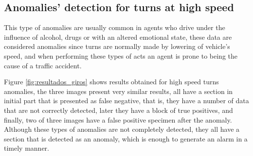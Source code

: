\subsection{Anomalies' detection for turns at high speed}

This type of anomalies are usually common in agents who drive under the influence of alcohol, drugs or with an altered emotional state, these data are considered anomalies since turns are normally made by lowering of vehicle's speed, and when performing these types of acts an agent is prone to being the cause of a traffic accident.

\vspace{5mm} %

Figure \ref{fig:resultados_giros} shows results obtained for high speed turns anomalies, the three images present very similar results, all have a section in initial part that is presented as false negative, that is, they have a number of data that are not correctly detected, later they have a block of true positives, and finally, two of three images have a false positive specimen after the anomaly. Although these types of anomalies are not completely detected, they all have a section that is detected as an anomaly, which is enough to generate an alarm in a timely manner.

